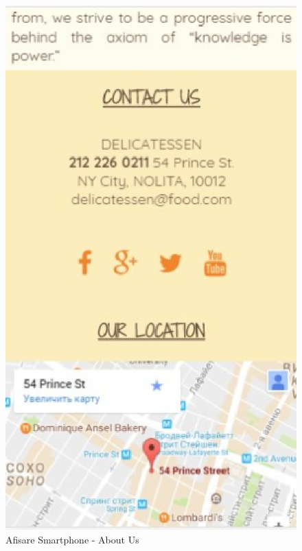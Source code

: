 \documentclass[11pt]{article}
\begin{document}
\begin{figure}[h]
\includegraphics{images/83.eps}
\caption{Afisare Smartphone - About Us}
\end{figure}
\end{document}
